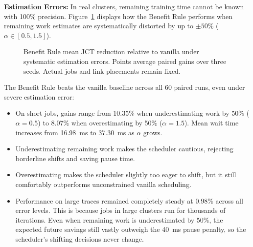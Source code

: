 \documentclass[conference]{IEEEtran}
\begin{document}
\textbf{Estimation Errors:} In real clusters, remaining training time cannot be known with 100\% precision. Figure~\ref{fig:estimate-results} displays how the Benefit Rule performs when remaining work estimates are systematically distorted by up to $\pm 50\%$ ($\alpha \in [0.5, 1.5]$).

\begin{figure}[t]
\centering
{}
\caption{Benefit Rule mean JCT reduction relative to vanilla under systematic estimation errors. Points average paired gains over three seeds. Actual jobs and link placements remain fixed.}
\label{fig:estimate-results}
\end{figure}

The Benefit Rule beats the vanilla baseline across all 60 paired runs, even under severe estimation error:
\begin{itemize}
    \item On short jobs, gains range from 10.35\% when underestimating work by 50\% ($\alpha = 0.5$) to 8.07\% when overestimating by 50\% ($\alpha = 1.5$). Mean wait time increases from 16.98~ms to 37.30~ms as $\alpha$ grows.
    \item Underestimating remaining work makes the scheduler cautious, rejecting borderline shifts and saving pause time.
    \item Overestimating makes the scheduler slightly too eager to shift, but it still comfortably outperforms unconstrained vanilla scheduling.
    \item Performance on large traces remained completely steady at 0.98\% across all error levels. This is because jobs in large clusters run for thousands of iterations. Even when remaining work is underestimated by 50\%, the expected future savings still vastly outweigh the 40~ms pause penalty, so the scheduler's shifting decisions never change.
\end{itemize}
\end{document}
